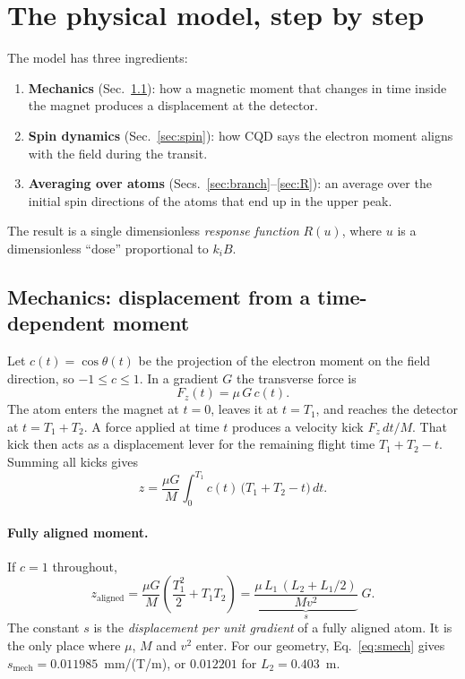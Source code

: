 \documentclass[11pt,a4paper]{article}
\begin{document}
\section{The physical model, step by step}

The model has three ingredients:
\begin{enumerate}
\item \textbf{Mechanics} (Sec.~\ref{sec:mech}): how a magnetic moment that changes in time inside the magnet produces a displacement at the detector.
\item \textbf{Spin dynamics} (Sec.~\ref{sec:spin}): how CQD says the electron moment aligns with the field during the transit.
\item \textbf{Averaging over atoms} (Secs.~\ref{sec:branch}--\ref{sec:R}): an average over the initial spin directions of the atoms that end up in the upper peak.
\end{enumerate}
The result is a single dimensionless \emph{response function} $R(u)$, where $u$ is a dimensionless ``dose'' proportional to $k_i B$.

\subsection{Mechanics: displacement from a time-dependent moment}
\label{sec:mech}
Let $c(t) = \cos\theta(t)$ be the projection of the electron moment on the field direction, so $-1\le c\le 1$. In a gradient $G$ the transverse force is
\begin{equation}
F_z(t) = \mu\, G\, c(t).
\end{equation}
The atom enters the magnet at $t=0$, leaves it at $t=T_1$, and reaches the detector at $t = T_1+T_2$. A force applied at time $t$ produces a velocity kick $F_z\,dt/M$. That kick then acts as a displacement lever for the remaining flight time $T_1 + T_2 - t$. Summing all kicks gives
\begin{equation}
z = \frac{\mu G}{M}\int_0^{T_1} c(t)\,\big(T_1+T_2-t\big)\,dt .
\label{eq:zint}
\end{equation}

\paragraph{Fully aligned moment.} If $c=1$ throughout,
\begin{equation}
z_\text{aligned} = \frac{\mu G}{M}\left(\frac{T_1^2}{2} + T_1T_2\right)
= \underbrace{\frac{\mu\, L_1\,(L_2 + L_1/2)}{M v^2}}_{\displaystyle s}\; G .
\label{eq:smech}
\end{equation}
The constant $s$ is the \emph{displacement per unit gradient} of a fully aligned atom. It is the only place where $\mu$, $M$ and $v^2$ enter. For our geometry, Eq.~\eqref{eq:smech} gives $s_\text{mech} = 0.011985$~mm/(T/m), or $0.012201$ for $L_2 = 0.403$~m.
\end{document}
